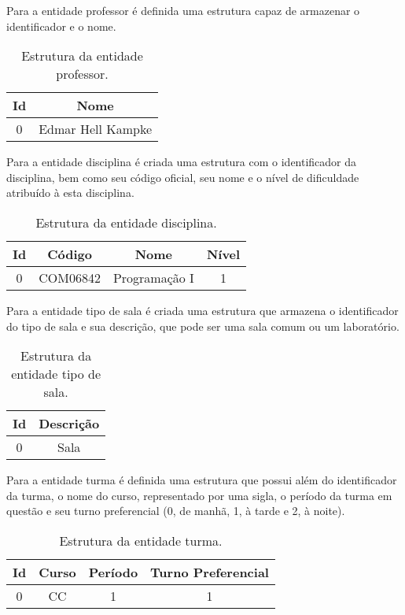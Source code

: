 Para a entidade professor é definida uma estrutura capaz de armazenar o identificador e o nome.

\begin{table}[h!]
\centering
\begin{tabular}{ | c | c | }\hline
\textbf{Id} & \textbf{Nome} \\\hline
0 & Edmar Hell Kampke \\\hline
\end{tabular}
\caption{Estrutura da entidade professor.}
\label{tbl-met-prof}
\end{table}

Para a entidade disciplina é criada uma estrutura com o identificador da disciplina, bem como seu código oficial, seu nome e o nível de dificuldade atribuído à esta disciplina.

\begin{table}[h!]
\centering
\begin{tabular}{ | c | c | c | c | }\hline
\textbf{Id} & \textbf{Código} & \textbf{Nome} & \textbf{Nível} \\\hline
0 & COM06842 & Programação I & 1 \\\hline
\end{tabular}
\caption{Estrutura da entidade disciplina.}
\label{tbl-met-disc}
\end{table}

Para a entidade tipo de sala é criada uma estrutura que armazena o identificador do tipo de sala e sua descrição, que pode ser uma sala comum ou um laboratório.

\begin{table}[h!]
\centering
\begin{tabular}{ | c | c | }\hline
\textbf{Id} & \textbf{Descrição} \\\hline
0 & Sala \\\hline
\end{tabular}
\caption{Estrutura da entidade tipo de sala.}
\label{tbl-met-tp-sala}
\end{table}

Para a entidade turma é definida uma estrutura que possui além do identificador da turma, o nome do curso, representado por uma sigla, o período da turma em questão e seu turno preferencial (0, de manhã, 1, à tarde e 2, à noite).

\begin{table}[h!]
\centering
\begin{tabular}{ | c | c | c | c | }\hline
\textbf{Id} & \textbf{Curso} & \textbf{Período} & \textbf{Turno Preferencial} \\\hline
0 & CC & 1 & 1 \\\hline
\end{tabular}
\caption{Estrutura da entidade turma.}
\label{tbl-met-turm}
\end{table}

